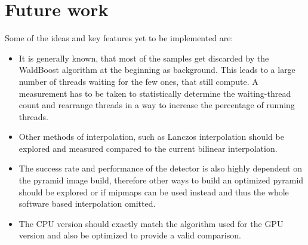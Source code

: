 \section{Future work}

Some of the ideas and key features yet to be implemented are:

\begin{itemize}
	\item It is generally known, that most of the samples get discarded by the WaldBoost algorithm at the beginning as background. This leads to a large number of threads waiting for the few ones, that still compute. A measurement has to be taken to statistically determine the waiting-thread count and rearrange threads in a way to increase the percentage of running threads.
	\item Other methods of interpolation, such as Lanczos interpolation should be explored and measured compared to the current bilinear interpolation.
	\item The success rate and performance of the detector is also highly dependent on the pyramid image build, therefore other ways to build an optimized pyramid should be explored or if mipmaps can be used instead and thus the whole software based interpolation omitted.
	\item The CPU version should exactly match the algorithm used for the GPU version and also be optimized to provide a valid comparison.

\end{itemize}


\nocite{zemcik-high-performance}
\nocite{herout-realtime-cuda}